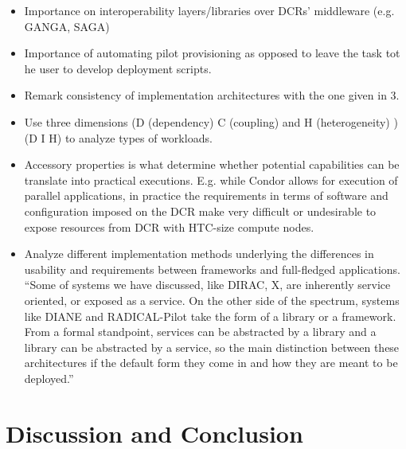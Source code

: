 \documentclass{sig-alternate}
\begin{document}
\begin{itemize}

\item Importance on interoperability layers/libraries over DCRs' middleware
(e.g. GANGA, SAGA)

\item Importance of automating pilot provisioning as opposed to leave the task tot he user to develop deployment scripts.

\item Remark consistency of implementation architectures with the one given in
3.

\item Use three dimensions (D (dependency) C (coupling) and H (heterogeneity) )
  (D I H) to analyze types of workloads. 

\item Accessory properties is what determine whether potential capabilities can
be translate into practical executions. E.g. while Condor allows for execution
of parallel applications, in practice the requirements in terms of software and
configuration imposed on the DCR make very difficult or undesirable to expose
resources from DCR with HTC-size compute nodes.

\item Analyze different implementation methods underlying the differences in usability and requirements between frameworks and full-fledged applications. ``Some of systems we have discussed, like DIRAC, X, are inherently service
oriented, or exposed as a service. On the other side of the spectrum, systems
like DIANE and RADICAL-Pilot take the form of a library or a framework. From a
formal standpoint, services can be abstracted by a library and a library can be
abstracted by a service, so the main distinction between these architectures if
the default form they come in and how they are meant to be deployed.''

\end{itemize}


%
\section{Discussion and Conclusion}
\label{sec:discussion}
\end{document}
